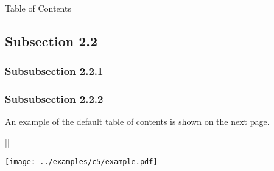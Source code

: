 \begin{fragileframe}{Table of Contents}
\begin{example}
\begin{multicols}{2}
\begin{LCL}
\subsection{Subsection 2.2}
\subsubsection{Subsubsection 2.2.1}
\subsubsection{Subsubsection 2.2.2}
\end{LCL}
\end{multicols}
\end{example}
An example of the default table of contents is shown on the next page.

\end{fragileframe}

\begin{fragileframe}
\begin{center}
\LC|\frame{\tableofcontents}|\medskip

\texttt{[image: ../examples/c5/example.pdf]}
\end{center}
\end{fragileframe}



